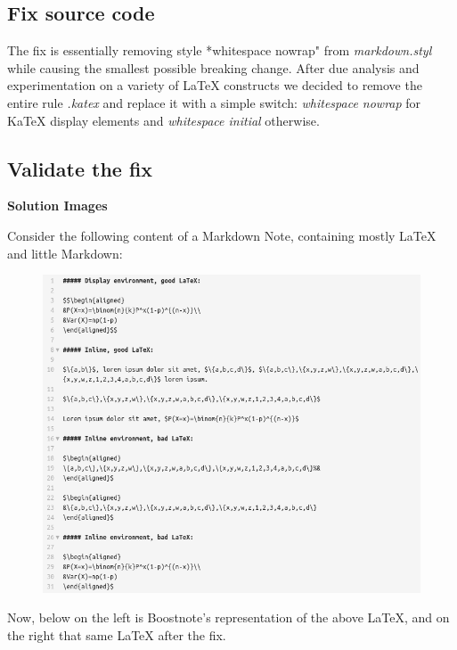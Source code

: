 \documentclass[main.tex]{subfiles}
\begin{document}
\subsection{Fix source code}

The fix is essentially removing style *whitespace nowrap" from \textit{markdown.styl} while causing the smallest possible breaking change. After due analysis and experimentation on a variety of LaTeX constructs we decided to remove the entire rule \textit{.katex} and replace it with a simple switch: \textit{whitespace nowrap} for KaTeX display elements and \textit{whitespace initial} otherwise.

\subsection{Validate the fix}

\textbf{Solution Images}

Consider the following content of a Markdown Note, containing mostly LaTeX and little Markdown:

\begin{figure}[H]
\includegraphics[scale=0.5]{images/solution1.png}
\centering
\end{figure}

Now, below on the left is Boostnote's representation of the above LaTeX, and on the right that same LaTeX after the fix.
\end{document}
